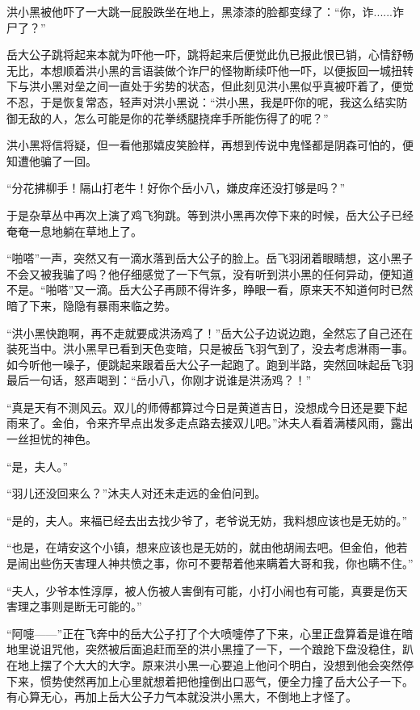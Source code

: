 洪小黑被他吓了一大跳一屁股跌坐在地上，黑漆漆的脸都变绿了：“你，诈......诈尸了？”

岳大公子跳将起来本就为吓他一吓，跳将起来后便觉此仇已报此恨已销，心情舒畅无比，本想顺着洪小黑的言语装做个诈尸的怪物断续吓他一吓，以便扳回一城扭转下与洪小黑对垒之间一直处于劣势的状态，但此刻见洪小黑似乎真被吓着了，便觉不忍，于是恢复常态，轻声对洪小黑说：“洪小黑，我是吓你的呢，我这么结实防御无敌的人，怎么可能是你的花拳绣腿挠痒手所能伤得了的呢？”

洪小黑将信将疑，但一看他那嬉皮笑脸样，再想到传说中鬼怪都是阴森可怕的，便知遭他骗了一回。

“分花拂柳手！隔山打老牛！好你个岳小八，嫌皮痒还没打够是吗？”

于是杂草丛中再次上演了鸡飞狗跳。等到洪小黑再次停下来的时候，岳大公子已经奄奄一息地躺在草地上了。

“啪嗒”一声，突然又有一滴水落到岳大公子的脸上。岳飞羽闭着眼睛想，这小黑子不会又被我骗了吗？他仔细感觉了一下气氛，没有听到洪小黑的任何异动，便知道不是。“啪嗒”又一滴。岳大公子再顾不得许多，睁眼一看，原来天不知道何时已然暗了下来，隐隐有暴雨来临之势。

“洪小黑快跑啊，再不走就要成洪汤鸡了！”岳大公子边说边跑，全然忘了自己还在装死当中。洪小黑早已看到天色变暗，只是被岳飞羽气到了，没去考虑淋雨一事。如今听他一噪子，便跳起来跟着岳大公子一起跑了。跑到半路，突然回味起岳飞羽最后一句话，怒声喝到：“岳小八，你刚才说谁是洪汤鸡？！”

\splitline

“真是天有不测风云。双儿的师傅都算过今日是黄道吉日，没想成今日还是要下起雨来了。金伯，令来齐早点出发多走点路去接双儿吧。”沐夫人看着满楼风雨，露出一丝担忧的神色。

“是，夫人。”

“羽儿还没回来么？”沐夫人对还未走远的金伯问到。

“是的，夫人。来福已经去出去找少爷了，老爷说无妨，我料想应该也是无妨的。”

“也是，在靖安这个小镇，想来应该也是无妨的，就由他胡闹去吧。但金伯，他若是闹出些伤天害理人神共愤之事，你可不要帮着他来瞒着大哥和我，你也瞒不住。”

“夫人，少爷本性淳厚，被人伤被人害倒有可能，小打小闹也有可能，真要是伤天害理之事则是断无可能的。”

\splitline

“阿嚏------”正在飞奔中的岳大公子打了个大喷嚏停了下来，心里正盘算着是谁在暗地里说诅咒他，突然被后面追赶而至的洪小黑撞了一下，一个踉跄下盘没稳住，趴在地上摆了个大大的大字。原来洪小黑一心要追上他问个明白，没想到他会突然停下来，惯势使然再加上心里就想着把他撞倒出口恶气，便全力撞了岳大公子一下。有心算无心，再加上岳大公子力气本就没洪小黑大，不倒地上才怪了。

